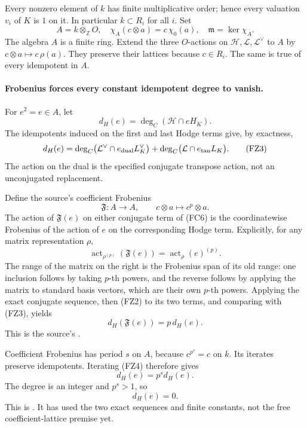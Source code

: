 Every nonzero element of \(k\) has finite multiplicative
order; hence every valuation \(v_i\) of \(K\) is \(1\)
on it.
In particular \(k\subset R_i\) for all \(i\).
Set
\[
 A=k\otimes_{\mathbb Z}O,\quad
 \chi_A(c\otimes a)=c\,\chi_0(a),\quad
 \mathfrak m=\ker\chi_A .
\]
The algebra \(A\) is a finite ring.
Extend the three \(O\)-actions on
\(\mathcal H,\mathcal L,\mathcal L^\vee\) to \(A\)
by \(c\otimes a\mapsto c\,\rho(a)\).
They preserve their lattices because \(c\in R_i\).
The same is true of every idempotent in \(A\).

\paragraph{Frobenius forces every constant idempotent degree to vanish.}
For \(e^2=e\in A\), let
\[
                            d_H(e)=\deg_C(\mathcal H\cap eH_K).
\]
The idempotents induced on the first and last Hodge
terms give, by exactness,
\[
 d_H(e)=
 \deg_C\bigl(\mathcal L^\vee\cap e_{\rm dual}L_K^\vee\bigr)
 +\deg_C\bigl(\mathcal L\cap e_{\rm tan}L_K\bigr).
 \tag{FZ3}\label{eq:faithful-idempotent-Hodge-degree}
\]
The action on the dual is the specified conjugate
transpose action, not an unconjugated replacement.

Define the source's coefficient Frobenius
\[
                \mathfrak F:A\to A,\qquad
                             c\otimes a\longmapsto c^p\otimes a.
\]
The action of \(\mathfrak F(e)\) on either conjugate
term of (FC6) is the coordinatewise Frobenius of the
action of \(e\) on the corresponding Hodge term.
Explicitly, for any matrix representation \(\rho\),
\[
 \operatorname{act}_{\rho^{(p)}}(\mathfrak F(e))
                              =\operatorname{act}_\rho(e)^{(p)}.
\]
The range of the matrix on the right is the Frobenius
span of its old range: one inclusion follows by
taking \(p\)-th powers, and the reverse follows by
applying the matrix to standard basis vectors,
which are their own \(p\)-th powers.
Applying the exact conjugate sequence, then (FZ2)
to its two terms, and comparing with (FZ3), yields
\[
                              d_H(\mathfrak F(e))=p\,d_H(e).
 \tag{FZ4}\label{eq:faithful-idempotent-Frobenius-step}
\]
This is the source's .

Coefficient Frobenius has period \(s\) on \(A\), because
\(c^{p^s}=c\) on \(k\).
Its iterates preserve idempotents.
Iterating (FZ4) therefore gives
\[
                          d_H(e)=p^s d_H(e).
\]
The degree is an integer and \(p^s>1\), so
\[
                                  d_H(e)=0.
 \tag{FZ5}\label{eq:faithful-idempotent-degree-zero}
\]
This is .
It has used the two exact sequences and finite constants,
not the free coefficient-lattice premise yet.

